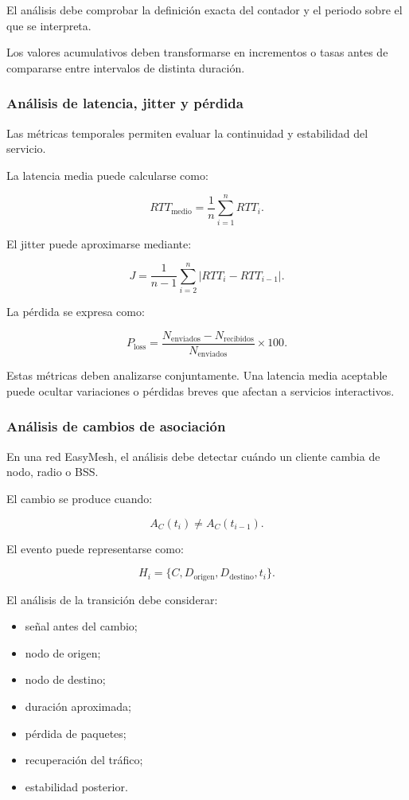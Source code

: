 El análisis debe comprobar la definición exacta del contador y el periodo
sobre el que se interpreta.

Los valores acumulativos deben transformarse en incrementos o tasas antes
de compararse entre intervalos de distinta duración.


\subsubsection*{Análisis de latencia, jitter y pérdida}

Las métricas temporales permiten evaluar la continuidad y estabilidad del
servicio.

La latencia media puede calcularse como:

\[
    RTT_{\mathrm{medio}}
    =
    \frac{1}{n}
    \sum_{i=1}^{n}
    RTT_i.
\]

El jitter puede aproximarse mediante:

\[
    J
    =
    \frac{1}{n-1}
    \sum_{i=2}^{n}
    \left|
        RTT_i-RTT_{i-1}
    \right|.
\]

La pérdida se expresa como:

\[
    P_{\mathrm{loss}}
    =
    \frac{
        N_{\mathrm{enviados}}
        -
        N_{\mathrm{recibidos}}
    }{
        N_{\mathrm{enviados}}
    }
    \times
    100.
\]

Estas métricas deben analizarse conjuntamente. Una latencia media
aceptable puede ocultar variaciones o pérdidas breves que afectan a
servicios interactivos.


\subsubsection*{Análisis de cambios de asociación}

En una red EasyMesh, el análisis debe detectar cuándo un cliente cambia
de nodo, radio o BSS.

El cambio se produce cuando:

\[
    A_C(t_i)
    \neq
    A_C(t_{i-1}).
\]

El evento puede representarse como:

\[
    H_i
    =
    \{
        C,
        D_{\mathrm{origen}},
        D_{\mathrm{destino}},
        t_i
    \}.
\]

El análisis de la transición debe considerar:

\begin{itemize}
    \item señal antes del cambio;

    \item nodo de origen;

    \item nodo de destino;

    \item duración aproximada;

    \item pérdida de paquetes;

    \item recuperación del tráfico;

    \item estabilidad posterior.
\end{itemize}

